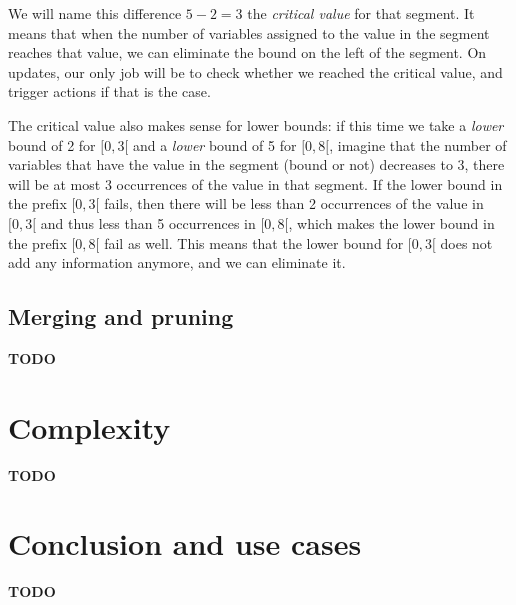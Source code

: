 \documentclass[a4paper,10pt]{article}
\begin{document}
We will name this difference $5-2=3$ the \emph{critical value} for that segment. It means that when the number of variables assigned to the value in the segment reaches that value, we can eliminate the bound on the left of the segment. On updates, our only job will be to check whether we reached the critical value, and trigger actions if that is the case.

The critical value also makes sense for lower bounds: if this time we take a \emph{lower} bound of 2 for $[0,3[$ and a \emph{lower} bound of 5 for $[0,8[$, imagine that the number of variables that have the value in the segment (bound or not) decreases to 3, there will be at most 3 occurrences of the value in that segment. If the lower bound in the prefix $[0,3[$ fails, then there will be less than 2 occurrences of the value in $[0,3[$ and thus less than 5 occurrences in $[0,8[$, which makes the lower bound in the prefix $[0,8[$ fail as well. This means that the lower bound for $[0,3[$ does not add any information anymore, and we can eliminate it.

\subsection{Merging and pruning}
\label{subsec:merging-pruning}
\textbf{TODO}

\section{Complexity}
\textbf{TODO}

\section{Conclusion and use cases}
\textbf{TODO}
\end{document}

